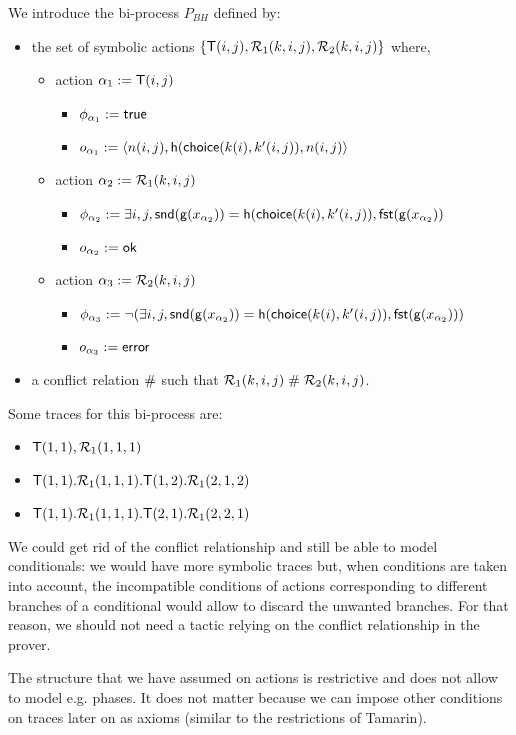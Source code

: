 \begin{example}
  \label{ex:basic-hash-bi-process}
  We introduce the bi-process $P_{BH}$ defined by:
  \begin{itemize}
    \item the set of symbolic actions $\{\textsf{T}(i,j),\mathcal{R}_1(k,i,j),\mathcal{R}_2(k,i,j)\}$ where,
    \begin{itemize}
      \item action $\alpha_1 := \textsf{T}(i,j)$
        \begin{itemize}
          \item $\phi_{\alpha_1} := \textsf{true}$
          \item $o_{\alpha_1} := \langle n(i,j), \mathsf{h}(\mathsf{choice}(k(i),k'(i,j)),n(i,j) \rangle$
        \end{itemize}
      \item action $\alpha_2 := \mathcal{R}_1(k,i,j)$
        \begin{itemize}
          \item $\phi_{\alpha_2} := \exists i,j, \mathsf{snd}(\mathsf{g}(x_{\alpha_2})) =  \mathsf{h}(\mathsf{choice}(k(i),k'(i,j)),\mathsf{fst}(\mathsf{g}(x_{\alpha_2}))$
          \item $o_{\alpha_2} := \mathsf{ok}$
        \end{itemize}
      \item action $\alpha_3 := \mathcal{R}_2(k,i,j)$
        \begin{itemize}
          \item $\phi_{\alpha_3} := \neg (\exists i,j, \mathsf{snd}(\mathsf{g}(x_{\alpha_2})) =  \mathsf{h}(\mathsf{choice}(k(i),k'(i,j)),\mathsf{fst}(\mathsf{g}(x_{\alpha_2})))$
          \item $o_{\alpha_3} := \mathsf{error}$
        \end{itemize}
    \end{itemize}
    \item a conflict relation $\mathrel{\#}$ such that $\mathcal{R}_1(k,i,j)\mathrel{\#}\mathcal{R}_2(k,i,j)$.
  \end{itemize}

\noindent
Some traces for this bi-process are:
  \begin{itemize}
    \item $\textsf{T}(1,1),\mathcal{R}_1(1,1,1)$
    \item $\textsf{T}(1,1).\mathcal{R}_1(1,1,1).\textsf{T}(1,2).\mathcal{R}_1(2,1,2)$
    \item $\textsf{T}(1,1).\mathcal{R}_1(1,1,1).\textsf{T}(2,1).\mathcal{R}_1(2,2,1)$
  \end{itemize}
\end{example}

\bigskip
\noindent
\begin{remark}
  We could get rid of the conflict relationship and still be able to
  model conditionals: we would have more symbolic traces but, when conditions
  are taken into account, the incompatible conditions of actions corresponding
  to different branches of a conditional would allow to discard
  the unwanted branches. For that reason, we should not need a tactic
  relying on the conflict relationship in the prover.
\end{remark}

\begin{remark}
  The structure that we have assumed on actions is restrictive and
  does not allow to model e.g. phases. It does not matter because we can
  impose other conditions on traces later on as axioms (similar to the
  restrictions of Tamarin).
\end{remark}
